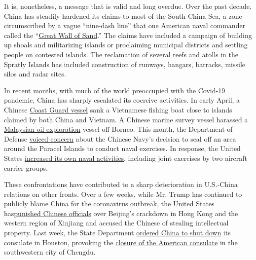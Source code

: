 It is, nonetheless, a message that is valid and long overdue. Over the
past decade, China has steadily hardened its claims to most of the South
China Sea, a zone circumscribed by a vague ``nine-dash line'' that one
American naval commander called the
``\href{https://www.bbc.com/news/world-asia-32126840}{Great Wall of
Sand}.'' The claims have included a campaign of building up shoals and
militarizing islands or proclaiming municipal districts and settling
people on contested islands. The reclamation of several reefs and atolls
in the Spratly Islands has included construction of runways, hangars,
barracks, missile silos and radar sites.

In recent months, with much of the world preoccupied with the Covid-19
pandemic, China has sharply escalated its coercive activities. In early
April, a Chinese
\href{https://www.defense.gov/Newsroom/Releases/Release/Article/2143925/china-coast-guard-sinking-of-a-vietnam-fishing-vessel/}{Coast
Guard vessel} sank a Vietnamese fishing boat close to islands claimed by
both China and Vietnam. A Chinese marine survey vessel harassed a
\href{https://www.reuters.com/article/us-china-security-malaysia/malaysian-oil-exploration-vessel-leaves-south-china-sea-waters-after-standoff-idUSKBN22O1M9\#:~:text=KUALA\%20LUMPUR\%20(Reuters)\%20\%2D\%20An,and\%20the\%20vessel\%20operator\%20said.}{Malaysian
oil exploration} vessel off Borneo. This month, the Department of
Defense
\href{https://www.defense.gov/Newsroom/Releases/Release/Article/2246604/peoples-republic-of-china-military-exercises-in-the-south-china-sea/}{voiced
concern} about the Chinese Navy's decision to seal off an area around
the Paracel Islands to conduct naval exercises. In response, the United
States
\href{https://www.nytimes3xbfgragh.onion/2020/07/04/us/politics/south-china-sea-aircraft-carrier.html?searchResultPosition=1}{increased
its own naval activities}, including joint exercises by two aircraft
carrier groups.

These confrontations have contributed to a sharp deterioration in
U.S.-China relations on other fronts. Over a few weeks, while Mr. Trump
has continued to publicly blame China for the coronavirus outbreak, the
United States
has\href{https://www.nytimes3xbfgragh.onion/2020/07/15/world/asia/china-trump-hong-kong.html}{punished
Chinese officials} over Beijing's crackdown in Hong Kong and the western
region of Xinjiang and accused the Chinese of stealing intellectual
property. Last week, the State Department
\href{https://www.bbc.com/news/world-us-canada-53497193}{ordered China
to shut down} its consulate in Houston, provoking the
\href{https://www.nytimes3xbfgragh.onion/2020/07/24/world/asia/china-us-consulate-chengdu.html}{closure
of the American consulate} in the southwestern city of Chengdu.

